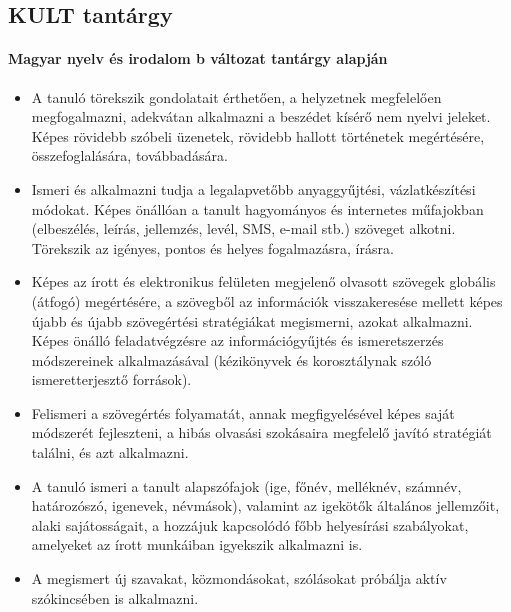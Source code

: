 \subsection{KULT tantárgy}
\paragraph{Magyar nyelv és irodalom
	b változat tantárgy alapján}
\begin{itemize}
\item A tanuló törekszik gondolatait érthetően, a helyzetnek megfelelően megfogalmazni, adekvátan alkalmazni a beszédet kísérő nem nyelvi jeleket. Képes rövidebb szóbeli üzenetek, rövidebb hallott történetek megértésére, összefoglalására, továbbadására.
\item Ismeri és alkalmazni tudja a legalapvetőbb anyaggyűjtési, vázlatkészítési módokat. Képes önállóan a tanult hagyományos és internetes műfajokban (elbeszélés, leírás, jellemzés, levél, SMS, e-mail stb.) szöveget alkotni. Törekszik az igényes, pontos és helyes fogalmazásra, írásra.
\item Képes az írott és elektronikus felületen megjelenő olvasott szövegek globális (átfogó) megértésére, a szövegből az információk visszakeresése mellett képes újabb és újabb szövegértési stratégiákat megismerni, azokat alkalmazni. Képes önálló feladatvégzésre az információgyűjtés és ismeretszerzés módszereinek alkalmazásával (kézikönyvek és korosztálynak szóló ismeretterjesztő források).
\item Felismeri a szövegértés folyamatát, annak megfigyelésével képes saját módszerét fejleszteni, a hibás olvasási szokásaira megfelelő javító stratégiát találni, és azt alkalmazni.
\item A tanuló ismeri a tanult alapszófajok (ige, főnév, melléknév, számnév, határozószó, igenevek, névmások), valamint az igekötők általános jellemzőit, alaki sajátosságait, a hozzájuk kapcsolódó főbb helyesírási szabályokat, amelyeket az írott munkáiban igyekszik alkalmazni is.
\item A megismert új szavakat, közmondásokat, szólásokat próbálja aktív szókincsében is alkalmazni.

\end{itemize}
